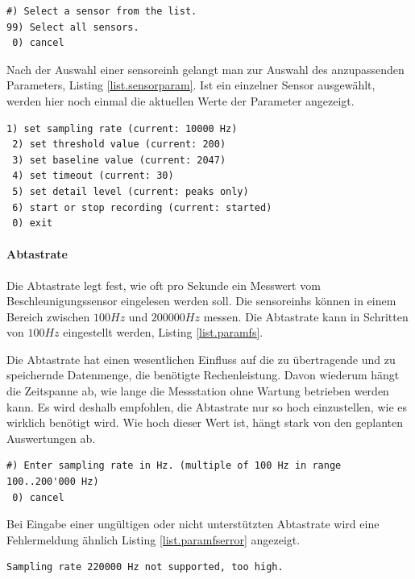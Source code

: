 
\begin{lstlisting}[caption=Untermenü Sensor-Auswahl, label=list.sensorsel]
 #) Select a sensor from the list.
99) Select all sensors.
 0) cancel
\end{lstlisting}

Nach der Auswahl einer \gls{sensoreinh} gelangt man zur Auswahl des anzupassenden Parameters, Listing \ref{list.sensorparam}. Ist ein einzelner Sensor ausgewählt, werden hier noch einmal die aktuellen Werte der Parameter angezeigt.

\begin{lstlisting}[caption=Untermenü Sensor-Parameter, label=list.sensorparam]
 1) set sampling rate (current: 10000 Hz)
 2) set threshold value (current: 200)
 3) set baseline value (current: 2047)
 4) set timeout (current: 30)
 5) set detail level (current: peaks only)
 6) start or stop recording (current: started)
 0) exit
\end{lstlisting}

\paragraph{Abtastrate} Die Abtastrate legt fest, wie oft pro Sekunde ein Messwert vom Beschleunigungssensor eingelesen werden soll. Die \glspl{sensoreinh} können in einem Bereich zwischen \ensuremath{100 Hz} und \ensuremath{200000 Hz} messen. Die Abtastrate kann in Schritten von \ensuremath{100 Hz} eingestellt werden, Listing \ref{list.paramfs}.

Die Abtastrate hat einen wesentlichen Einfluss auf die zu übertragende und zu speichernde Datenmenge, die benötigte Rechenleistung. Davon wiederum hängt die Zeitspanne ab, wie lange die Messstation ohne Wartung betrieben werden kann. Es wird deshalb empfohlen, die Abtastrate nur so hoch einzustellen, wie es wirklich benötigt wird. Wie hoch dieser Wert ist, hängt stark von den geplanten Auswertungen ab.

\begin{lstlisting}[caption=Untermenü Abtastrate, label=list.paramfs]
 #) Enter sampling rate in Hz. (multiple of 100 Hz in range 100..200'000 Hz)
 0) cancel
\end{lstlisting}

Bei Eingabe einer ungültigen oder nicht unterstützten Abtastrate wird eine Fehlermeldung ähnlich Listing \ref{list.paramfserror} angezeigt.

\begin{lstlisting}[caption=Fehlermeldung bei ungültiger Abtastrate, label=list.paramfserror]
Sampling rate 220000 Hz not supported, too high.
\end{lstlisting}

